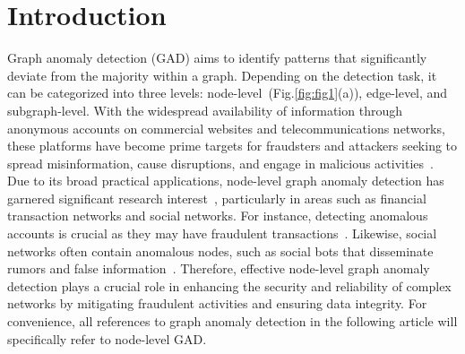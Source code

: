 \documentclass{article}
\begin{document}
\section{Introduction}
Graph anomaly detection (GAD) aims to identify patterns that significantly deviate from the majority within a graph. Depending on the detection task, it can be categorized into three levels: node-level~(Fig.\ref{fig:fig1}(a)), edge-level, and subgraph-level. With the widespread availability of information through anonymous accounts on commercial websites and telecommunications networks, these platforms have become prime targets for fraudsters and attackers seeking to spread misinformation, cause disruptions, and engage in malicious activities~\cite{pourhabibi2020fraud}. Due to its broad practical applications, node-level graph anomaly detection has garnered significant research interest~\cite{pourhabibi2020fraud,twbot22_feng2022twibot,tang2022rethinking,dae_fan2020anomalydae}, particularly in areas such as financial transaction networks and social networks. For instance, detecting anomalous accounts is crucial as they may have fraudulent transactions~\cite{tang2022rethinking}. Likewise, social networks often contain anomalous nodes, such as social bots that disseminate rumors and false information~\cite{twbot22_feng2022twibot}. Therefore, effective node-level graph anomaly detection plays a crucial role in enhancing the security and reliability of complex networks by mitigating fraudulent activities and ensuring data integrity. For convenience, all references to graph anomaly detection in the following article will specifically refer to node-level GAD.


\end{document}
